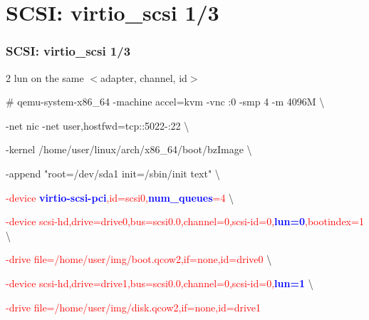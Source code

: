 \documentclass[aspectratio=169]{beamer}
\begin{document}
\section{SCSI: virtio\_scsi 1/3}
\begin{frame}
\frametitle{SCSI: virtio\_scsi 1/3}
{\LARGE 2 lun on the same $<$adapter, channel, id$>$}
\\
\begin{block}{}

\# qemu-system-x86\_64 -machine accel=kvm -vnc :0 -smp 4 -m 4096M \textbackslash

-net nic -net user,hostfwd=tcp::5022-:22 \textbackslash

-kernel /home/user/linux/arch/x86\_64/boot/bzImage \textbackslash
	
-append "root=/dev/sda1 init=/sbin/init text" \textbackslash

\textcolor{red}{-device \textbf{\textcolor{blue}{virtio-scsi-pci}},id=scsi0,\textbf{\textcolor{blue}{num\_queues}}=4} \textbackslash
	
\textcolor{red}{-device scsi-hd,drive=drive0,bus=scsi0.0,channel=0,scsi-id=0,\textbf{\textcolor{blue}{lun=0}},bootindex=1} \textbackslash

\textcolor{red}{-drive file=/home/user/img/boot.qcow2,if=none,id=drive0} \textbackslash

\textcolor{red}{-device scsi-hd,drive=drive1,bus=scsi0.0,channel=0,scsi-id=0,\textbf{\textcolor{blue}{lun=1}}} \textbackslash

\textcolor{red}{-drive file=/home/user/img/disk.qcow2,if=none,id=drive1}
\end{block}
\end{frame}

\end{document}

